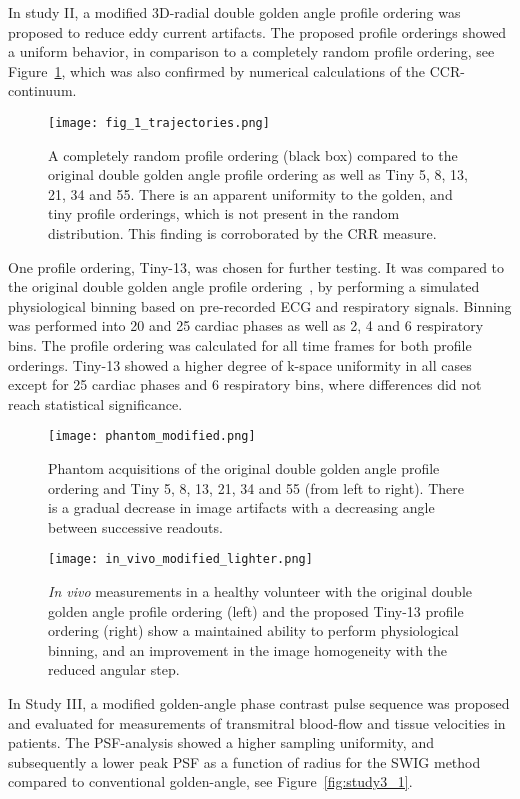 In study II, a modified 3D-radial double golden angle profile ordering was proposed to reduce eddy current artifacts. The proposed profile orderings showed a uniform behavior, in comparison to a completely random profile ordering, see Figure~\ref{fig:study2_1}, which was also confirmed by numerical calculations of the CCR-continuum.
\begin{figure}[htbp]
    \centering
    \texttt{[image: fig\_1\_trajectories.png]}
    \caption{A completely random profile ordering (black box) compared to the original double golden angle profile ordering as well as Tiny 5, 8, 13, 21, 34 and 55. There is an apparent uniformity to the golden, and tiny profile orderings, which is not present in the random distribution. This finding is corroborated by the CRR measure.}
    \label{fig:study2_1}
\end{figure}
One profile ordering, Tiny-13, was chosen for further testing. It was compared to the original double golden angle profile ordering~\cite{Chan2009}, by performing a simulated physiological binning based on pre-recorded ECG and respiratory signals. Binning was performed into 20 and 25 cardiac phases as well as 2, 4 and 6 respiratory bins. The profile ordering was calculated for all time frames for both profile orderings. Tiny-13 showed a higher degree of k-space uniformity in all cases except for 25 cardiac phases and 6 respiratory bins, where differences did not reach statistical significance.
\begin{figure}[htbp]
    \centering
    \texttt{[image: phantom\_modified.png]}
    \caption{Phantom acquisitions of the original double golden angle profile ordering and Tiny 5, 8, 13, 21, 34 and 55 (from left to right). There is a gradual decrease in image artifacts with a decreasing angle between successive readouts.}
    \label{fig:study2_2}
\end{figure}
\begin{figure}[htbp]
    \centering
    \texttt{[image: in\_vivo\_modified\_lighter.png]}
    \caption{\emph{In vivo} measurements in a healthy volunteer with the original double golden angle profile ordering (left) and the proposed Tiny-13 profile ordering (right) show a maintained ability to perform physiological binning, and an improvement in the image homogeneity with the reduced angular step.}
    \label{fig:study2_3}
\end{figure}
In Study III, a modified golden-angle phase contrast pulse sequence was proposed and evaluated for measurements of transmitral blood-flow and tissue velocities in patients. The PSF-analysis showed a higher sampling uniformity, and subsequently a lower peak PSF as a function of radius for the SWIG method compared to conventional golden-angle, see Figure~\ref{fig:study3_1}.

